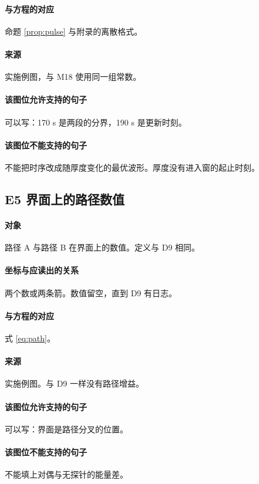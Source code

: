 \paragraph{与方程的对应}
命题 \ref{prop:pulse} 与附录的离散格式。

\paragraph{来源}
实施例图，与 M18 使用同一组常数。

\paragraph{该图位允许支持的句子}
可以写：170 s 是两段的分界，190 s 是更新时刻。

\paragraph{该图位不能支持的句子}
不能把时序改成随厚度变化的最优波形。厚度没有进入窗的起止时刻。

\subsection{E5 界面上的路径数值}
\paragraph{对象}
路径 A 与路径 B 在界面上的数值。定义与 D9 相同。

\paragraph{坐标与应读出的关系}
两个数或两条箭。数值留空，直到 D9 有日志。

\paragraph{与方程的对应}
式 \eqref{eq:path}。

\paragraph{来源}
实施例图。与 D9 一样没有路径增益。

\paragraph{该图位允许支持的句子}
可以写：界面是路径分叉的位置。

\paragraph{该图位不能支持的句子}
不能填上对偶与无探针的能量差。

